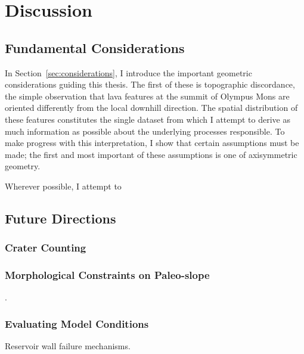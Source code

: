\chapter{Discussion}

\section{Fundamental Considerations}

In Section~\ref{sec:considerations}, I introduce the important geometric considerations guiding this thesis. The first of these is topographic discordance, the simple observation that lava features at the summit of Olympus Mons are oriented differently from the local downhill direction. The spatial distribution of these features constitutes the single dataset from which I attempt to derive as much information as possible about the underlying processes responsible. To make progress with this interpretation, I show that certain assumptions must be made; the first and most important of these assumptions is one of axisymmetric geometry.

Wherever possible, I attempt to 

\section{Future Directions}

\subsection{Crater Counting}
\textcite{kneissl_map-projection-independent_2011,robbins_volcanic_2011,
robbins_large_2013,
platz_crater-based_2013}

\subsection{Morphological Constraints on Paleo-slope}
\textcite{wadge_lobes_1991, peitersen_correlations_2000, peters_lava_2021}.

\subsection{Evaluating Model Conditions}

Reservoir wall failure mechanisms.

